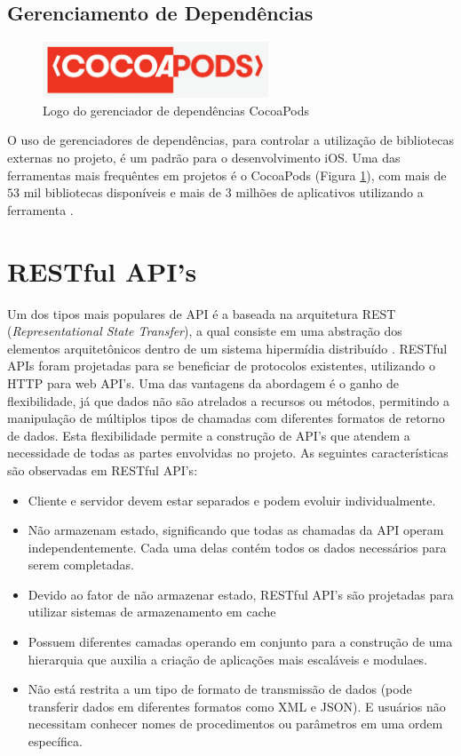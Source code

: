\subsection{Gerenciamento de Dependências}
\begin{figure}[h]
    \centering
    \includegraphics[width=0.6\textwidth]{pfc/figuras/cocoapods.png}
    \caption{Logo do gerenciador de dependências CocoaPods}
    \label{fig:cocoapods}
\end{figure}
O uso de gerenciadores de dependências, para controlar a utilização de bibliotecas externas no projeto, é um padrão para o desenvolvimento iOS. Uma das ferramentas mais frequêntes em projetos é o CocoaPods (Figura \ref{fig:cocoapods}), com mais de $53$ mil bibliotecas disponíveis e mais de $3$ milhões de aplicativos utilizando a ferramenta \cite{cocoapods}.

\section{RESTful API's}
Um dos tipos mais populares de API é a baseada na arquitetura REST (\textit{Representational State Transfer}), a qual consiste em uma abstração dos elementos arquitetônicos dentro de um sistema hipermídia distribuído \cite{rest-api}. 
RESTful APIs foram projetadas para se beneficiar de protocolos existentes, utilizando o HTTP para web API's. Uma das vantagens da abordagem é o ganho de flexibilidade, já que dados não são atrelados a recursos ou métodos, permitindo a manipulação de múltiplos tipos de chamadas com diferentes formatos de retorno de dados. Esta flexibilidade permite a construção de API's que atendem a necessidade de todas as partes envolvidas no projeto. As seguintes características são observadas em RESTful API's:

\begin{itemize}
    \item Cliente e servidor devem estar separados e podem evoluir individualmente.
    \item Não armazenam estado, significando que todas as chamadas da API operam independentemente. Cada uma delas contém todos os dados necessários para serem completadas.
    \item Devido ao fator de não armazenar estado, RESTful API's são projetadas para utilizar sistemas de armazenamento em cache
    \item Possuem diferentes camadas operando em conjunto para a construção de uma hierarquia que auxilia a criação de aplicações mais escaláveis e modulaes.
    \item Não está restrita a um tipo de formato de transmissão de dados (pode transferir dados em diferentes formatos como XML e JSON). E usuários não necessitam conhecer nomes de procedimentos ou parâmetros em uma ordem específica.
\end{itemize}

